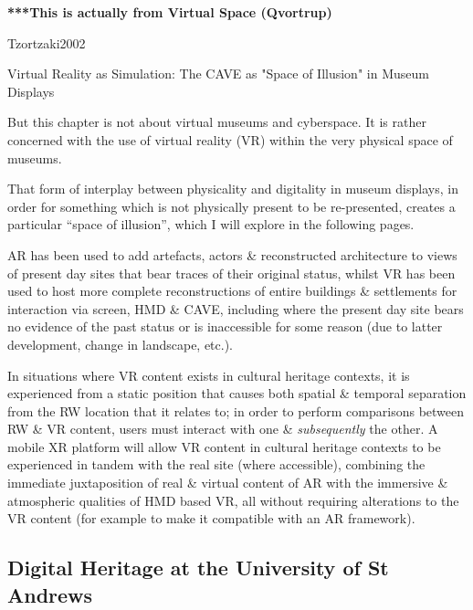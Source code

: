 
\textbf{***This is actually from Virtual Space (Qvortrup)}

Tzortzaki2002

Virtual Reality as Simulation: The CAVE as "Space of Illusion" in Museum Displays

But this chapter is not about virtual museums and cyberspace. It is rather concerned with the use of virtual reality (VR) within the very physical space of museums.

That form of interplay between physicality and digitality in museum displays, in order for something which is not physically present to be re-presented, creates a particular ``space of illusion'', which I will explore in the following pages.


AR has been used to add artefacts, actors \& reconstructed architecture to views of present day sites that bear traces of their original status, whilst VR has been used to host more complete reconstructions of entire buildings \& settlements for interaction via screen, HMD \& CAVE, including where the present day site bears no evidence of the past status or is inaccessible for some reason (due to latter development, change in landscape, etc.).

In situations where VR content exists in cultural heritage contexts, it is experienced from a static position that causes both spatial \& temporal separation from the RW location that it relates to; in order to perform comparisons between RW \& VR content, users must interact with one \& \textit{subsequently} the other. A mobile XR platform will allow VR content in cultural heritage contexts to be experienced in tandem with the real site (where accessible), combining the immediate juxtaposition of real \& virtual content of AR with the immersive \& atmospheric qualities of HMD based VR, all without requiring alterations to the VR content (for example to make it compatible with an AR framework).



\subsection{Digital Heritage at the University of St Andrews}

